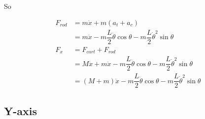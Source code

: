\documentclass{notes}
\begin{document}
So 

\begin{align*}
  F_{rod} & = m \ddot{x} + m (a_{t} + a_{c}) \\
         & = m \ddot{x} -m\dfrac{L}{2} \ddot{\theta} \cos \theta 
                        -m\dfrac{L}{2} \dot{\theta}^2 \sin \theta \\
  F_x & = F_{cart} + F_{rod} \\
      & = M\ddot{x} + m \ddot{x} - m\dfrac{L}{2} \ddot{\theta} \cos \theta 
                    - m \dfrac{L}{2} \dot{\theta}^2 \sin \theta \\
      & = (M + m) \ddot{x} - m\dfrac{L}{2} \ddot{\theta} \cos \theta 
                    - m \dfrac{L}{2} \dot{\theta}^2 \sin \theta
\end{align*}
\FloatBarrier


\subsection{Y-axis}
\end{document}
